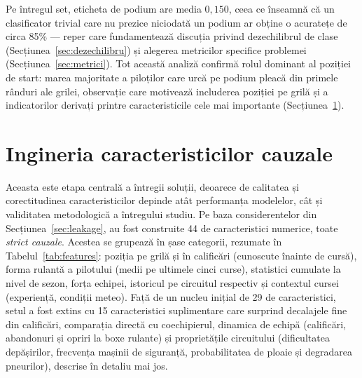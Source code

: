 \documentclass[12pt,a4paper]{report}
\begin{document}
Pe întregul set, eticheta de podium are media $0{,}150$, ceea ce înseamnă că un clasificator
trivial care nu prezice niciodată un podium ar obține o acuratețe de circa 85\% --- reper care
fundamentează discuția privind dezechilibrul de clase (Secțiunea~\ref{sec:dezechilibru}) și alegerea
metricilor specifice problemei (Secțiunea~\ref{sec:metrici}). Tot această analiză confirmă rolul
dominant al poziției de start: marea majoritate a piloților care urcă pe podium pleacă din primele
rânduri ale grilei, observație care motivează includerea poziției pe grilă și a indicatorilor
derivați printre caracteristicile cele mai importante (Secțiunea~\ref{sec:features}).

\section{Ingineria caracteristicilor cauzale}
\label{sec:features}

Aceasta este etapa centrală a întregii soluții, deoarece de calitatea și corectitudinea
caracteristicilor depinde atât performanța modelelor, cât și validitatea metodologică a întregului
studiu. Pe baza considerentelor din Secțiunea~\ref{sec:leakage}, au fost construite 44 de
caracteristici numerice, toate \emph{strict cauzale}. Acestea se grupează în șase categorii,
rezumate în Tabelul~\ref{tab:features}: poziția pe grilă și în calificări (cunoscute înainte de
cursă), forma rulantă a pilotului (medii pe ultimele cinci curse), statistici cumulate la nivel de
sezon, forța echipei, istoricul pe circuitul respectiv și contextul cursei (experiență, condiții
meteo). Față de un nucleu inițial de 29 de caracteristici, setul a fost extins cu 15
caracteristici suplimentare care surprind decalajele fine din calificări, comparația directă cu
coechipierul, dinamica de echipă (calificări, abandonuri și opriri la boxe rulante) și
proprietățile circuitului (dificultatea depășirilor, frecvența mașinii de siguranță, probabilitatea
de ploaie și degradarea pneurilor), descrise în detaliu mai jos.
\end{document}
